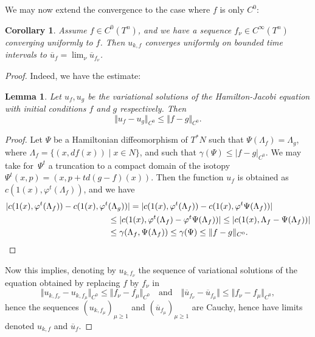 \documentclass[JEP,XML,SOM,NoFloatCountersInSection,Unicode,published]{cedram}
\newcommand{\quand}{\quad\text{and}\quad}
\newcommand{\HJ}{\mathrm{HJ}}
\numberwithin{equation}{section}
\let \phi \varphi
\theoremstyle{plain}
\newtheorem{lemma}[theorem]{Lemma}
\newtheorem{corollary}[theorem]{Corollary}
\theoremstyle{definition}
\theoremstyle{remark}
\begin{document}
We may now extend the convergence to the case where $f$ is only $C^{0}$:
\begin{corollary} Assume $f \in C^0 (T^n)$, and we have a sequence $f_\nu \in C^\infty (T^n) $ converging uniformly to $f$. Then $u_{k,f}$ converges uniformly on bounded time intervals to
$\overline u_{f} =\lim_\nu \overline u_{f_{\nu}}$.
\end{corollary}
\begin{proof} Indeed, we have the estimate:

\begin{lemma} \label{Lem-12.4} Let $u_f, u_g$ be the variational solutions of the Hamilton-Jacobi equation \thetag{$\HJ$} with initial conditions $f$ and $g$ respectively. Then
\[
\Vert {u}_f - { u}_g \Vert_{C^{0}} \leq \Vert f-g \Vert_{C^{0}}.
\]
\end{lemma}

\begin{proof}
Let $\Psi$ be a Hamiltonian diffeomorphism of $T^{*}N$ such that $\Psi (\Lambda_{f})=\Lambda_{g}$, where $\Lambda_{f}=\{(x,df(x)) \mid x \in N\}$, and such that $\gamma (\Psi) \leq \vert f-g \vert _{C^{0}}$. We may take for~$\Psi^{t}$ a truncation to a compact domain of the isotopy $\Psi^{t}(x,p)=(x, p+td(g-f)(x))$.
Then the function $u_{f}$ is obtained as $c(1(x),\phi^{t}(\Lambda_{f}))$, and we have
\begin{align*}
\vert c(1(x),\phi^{t}(\Lambda_{f})) - c(1(x),\phi^{t}&(\Lambda_{g})) \vert =
\vert c(1(x),\phi^{t}(\Lambda_{f})) - c(1(x),\phi^{t} \Psi (\Lambda_{f})) \vert\\
& \leq \vert c(1(x), \phi^{t}(\Lambda_{f})- \phi^{t} \Psi (\Lambda_{f})) \vert \leq \vert c(1(x), \Lambda_{f}- \Psi (\Lambda_{f})) \vert\\
&\leq \gamma (\Lambda_{f}, \Psi (\Lambda_{f})) \leq \gamma (\Psi)\leq \Vert f-g \Vert _{C^{0}}.\qedhere
\end{align*}
\end{proof}

Now this implies, denoting by $u_{k,f_{\nu}}$ the sequence of variational solutions of the equation obtained by replacing $f$ by $f_{\nu}$ in \thetag{$\HJ_{k}$}
\[
\Vert u_{k,f_{\nu}}-u_{k, f_{\mu}}\Vert_{C^0} \leq \Vert f_{\nu}- f_{\mu}\Vert _{C^0}\quand\Vert \overline u_{f_{\nu}}- \overline u_{f_{\mu}} \Vert \leq \Vert f_{\nu}- f_{\mu}\Vert _{C^0},
\]
hence the sequences $(u_{k,f_{\mu}})_{\mu \geq 1}$ and $(\overline u_{f_{\mu}})_{\mu\geq 1}$ are Cauchy, hence have limits denoted $u_{k,f}$ and $\overline u_{f}$.


\end{proof}
\end{document}
